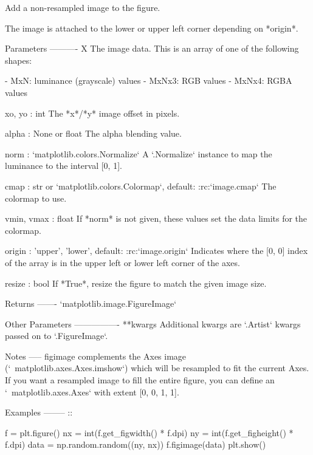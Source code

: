\begin{DoxyVerb}Add a non-resampled image to the figure.

The image is attached to the lower or upper left corner depending on
*origin*.

Parameters
----------
X
    The image data. This is an array of one of the following shapes:

    - MxN: luminance (grayscale) values
    - MxNx3: RGB values
    - MxNx4: RGBA values

xo, yo : int
    The *x*/*y* image offset in pixels.

alpha : None or float
    The alpha blending value.

norm : `matplotlib.colors.Normalize`
    A `.Normalize` instance to map the luminance to the
    interval [0, 1].

cmap : str or `matplotlib.colors.Colormap`, default: :rc:`image.cmap`
    The colormap to use.

vmin, vmax : float
    If *norm* is not given, these values set the data limits for the
    colormap.

origin : {'upper', 'lower'}, default: :rc:`image.origin`
    Indicates where the [0, 0] index of the array is in the upper left
    or lower left corner of the axes.

resize : bool
    If *True*, resize the figure to match the given image size.

Returns
-------
`matplotlib.image.FigureImage`

Other Parameters
----------------
**kwargs
    Additional kwargs are `.Artist` kwargs passed on to `.FigureImage`.

Notes
-----
figimage complements the Axes image (`~matplotlib.axes.Axes.imshow`)
which will be resampled to fit the current Axes.  If you want
a resampled image to fill the entire figure, you can define an
`~matplotlib.axes.Axes` with extent [0, 0, 1, 1].

Examples
--------
::

    f = plt.figure()
    nx = int(f.get_figwidth() * f.dpi)
    ny = int(f.get_figheight() * f.dpi)
    data = np.random.random((ny, nx))
    f.figimage(data)
    plt.show()
\end{DoxyVerb}
 \mbox{\label{classmatplotlib_1_1figure_1_1Figure_a6367e68d3e0650e547b94b364ea07961}} 
